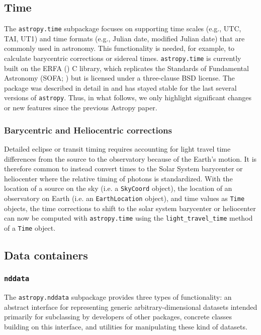 \documentclass[modern]{aastex61}
\newcommand{\package}[1]{\texttt{#1}\xspace}
\newcommand{\astropy}{Astropy\xspace}
\newcommand{\astropypkg}{\package{astropy}}
\begin{document}
\subsection{Time}
\label{sec:time}

The \package{astropy.time} subpackage focuses on supporting time scales (e.g.,
UTC, TAI, UT1) and time formats (e.g., Julian date, modified Julian date) that
are commonly used in astronomy.
This functionality is needed, for example, to calculate barycentric corrections
or sidereal times.
\package{astropy.time} is currently built on the ERFA (\citealt{erfa}) C
library, which replicates the Standards of Fundamental Astronomy (SOFA;
\citealt{sofa}) but is licensed under a three-clause BSD license.
The package was described in detail in  \citet{astropy} and has
stayed stable for the last several versions of \astropypkg.
Thus, in what follows, we only highlight significant changes or new features
since the previous \astropy paper.


\subsubsection{Barycentric and Heliocentric corrections}
Detailed eclipse or transit
        timing requires accounting for light travel time differences from the
        source to the observatory because of the Earth's motion.
        It is therefore common to instead convert times to the Solar System
        barycenter or heliocenter where the relative timing of photons is
        standardized.
        With the location of a source on the sky (i.e. a \texttt{SkyCoord}
        object), the location of an observatory on Earth (i.e. an
        \texttt{EarthLocation} object), and time values as \texttt{Time}
        objects, the time corrections to shift to the solar system barycenter or
        heliocenter can now be computed with \package{astropy.time} using the
        \texttt{light\_travel\_time} method of a \texttt{Time} object.

\subsection{Data containers}

\subsubsection{\package{nddata}}

The \package{astropy.nddata} subpackage provides three types of functionality: an
abstract interface for representing generic arbitrary-dimensional datasets
intended primarily for subclassing by developers of other packages, concrete
classes building on this interface, and utilities for manipulating these kind of
datasets.
\end{document}
